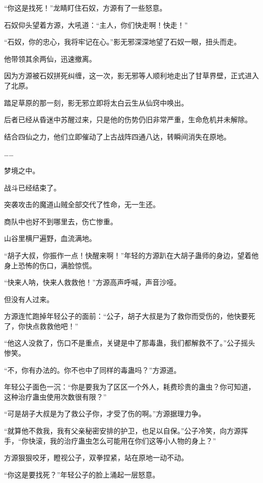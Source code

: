 
\begin{this_body}

“你这是找死！”龙睛盯住石奴，方源有了一些怒意。

石奴仰头望着方源，大吼道：“主人，你们快走啊！快走！”

“石奴，你的忠心，我将牢记在心。”影无邪深深地望了石奴一眼，扭头而走。

他带领其余两仙，迅速撤离。

因为方源被石奴拼死纠缠，这一次，影无邪等人顺利地走出了甘草界壁，正式进入了北原。

踏足草原的那一刻，影无邪立即将太白云生从仙窍中唤出。

后者已经从昏迷中苏醒过来，只是他的伤势仍旧非常严重，生命危机并未解除。

结合四仙之力，他们立即催动了上古战阵四通八达，转瞬间消失在原地。

……

梦境之中。

战斗已经结束了。

突袭攻击的魔道山贼全部交代了性命，无一生还。

商队中也好不到哪里去，伤亡惨重。

山谷里横尸遍野，血流满地。

“胡子大叔，你振作一点！快醒来啊！”年轻的方源趴在大胡子蛊师的身边，望着他身上恐怖的伤口，满脸惊慌。

“快来人呐，快来人救救他！”方源高声呼喊，声音沙哑。

但没有人过来。

方源连忙跑掉年轻公子的面前：“公子，胡子大叔是为了救你而受伤的，他快要死了，你快点救救他吧！”

“他这人没救了，伤口不是重点，关键是中了那毒蛊，我们都解救不了。”公子摇头惨笑。

“不，你有办法的。你不也中了同样的毒蛊吗？”方源道。

年轻公子面色一沉：“你是要我为了区区一个外人，耗费珍贵的蛊虫？你可知道，这种治疗蛊虫使用次数很有限？”

“可是胡子大叔是为了救公子你，才受了伤的啊。”方源据理力争。

“就算他不救我，我有父亲秘密安排的护卫，也足以自保。”公子冷笑，向方源挥手，“你快滚，我的治疗蛊虫怎么可能用在你们这等小人物的身上？”

方源狠狠咬牙，瞪视公子，双拳捏紧，站在原地一动不动。

“你这是要找死？”年轻公子的脸上涌起一层怒意。


\end{this_body}
